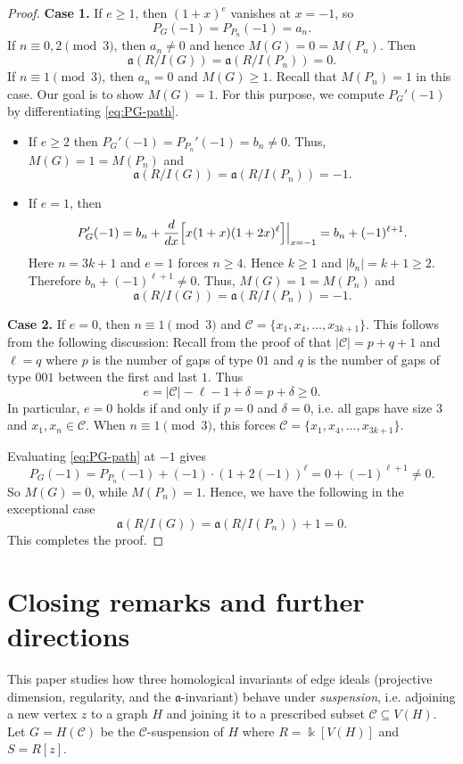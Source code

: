 \documentclass[12pt]{amsart}
\theoremstyle{plain}
\theoremstyle{definition}
\begin{document}
\begin{proof}
\textbf{Case 1.} If \(e\ge 1\), then \((1+x)^e\) vanishes at \(x=-1\), so
\[
P_G(-1)=P_{P_n}(-1)=a_n.
\]
If \(n\equiv 0,2\pmod 3\), then \(a_n\neq 0\) and hence \(M(G)=0=M(P_n)\). Then
   \[ 
    \mathfrak a (R/I(G))=\mathfrak a (R/I(P_n))=0.
   \]
If \(n\equiv 1\pmod 3\), then \(a_n=0\) and \(M(G)\ge 1\). Recall that $M(P_n)=1$ in this case. Our goal is to show $M(G)=1$. For this purpose, we compute \(P_G'(-1)\) by differentiating \eqref{eq:PG-path}.
\begin{itemize}
    \item If \(e\ge 2\) then  \(P_G'(-1)=P_{P_n}'(-1)=b_n\neq 0\).  Thus, \(M(G)=1=M(P_n)\) and
    \[ 
    \mathfrak a (R/I(G))= \mathfrak a (R/I(P_n))= -1.
    \]
    \item If \(e=1\), then 
\[
P_G'(-1)=b_n+\frac{d}{dx}\Bigl[x(1+x)(1+2x)^\ell\Bigr]\Big|_{x=-1}=b_n+(-1)^{\ell+1}.
\]
 Here \(n=3k+1\) and \(e=1\) forces \(n\ge 4\). Hence \(k\ge 1\) and \(|b_n|=k+1\ge 2\).
Therefore \(b_n+(-1)^{\ell+1}\neq 0\). Thus,  \(M(G)=1=M(P_n)\) and
   \[ 
    \mathfrak a (R/I(G))=\mathfrak a (R/I(P_n))=-1.
   \]
\end{itemize}
\textbf{Case 2.}  If \(e=0\), then \(n\equiv 1\pmod 3\) and \(\mathcal C=\{x_1,x_4,\ldots,x_{3k+1}\}\). This follows from the following discussion:
Recall from the proof of   that $|\mathcal C|=p+q+1$ and $ \ell=q$ where $p$ is the number of gaps
of type $01$ and  $q$ is the number of gaps of type $001$ between the first and last $1$. Thus
\[
e=|\mathcal C|-\ell-1+\delta=p+\delta\ge 0.
\]
In particular, \(e=0\) holds if and only if \(p=0\) and \(\delta=0\), i.e. all gaps have size \(3\) and
\(x_1,x_n\in\mathcal C\). When \(n\equiv 1\pmod 3\),  this forces
\(\mathcal C=\{x_1,x_4,\ldots,x_{3k+1}\}\).


 Evaluating \eqref{eq:PG-path} at \(-1\) gives
\[
P_G(-1)=P_{P_n}(-1)+(-1)\cdot(1+2(-1))^\ell
      =0+(-1)^{\ell+1}\neq 0.
\]
So \(M(G)=0\), while \(M(P_n)=1\). Hence, we have the following in the exceptional case
   \[ 
    \mathfrak a (R/I(G))=\mathfrak a (R/I(P_n))+1=0.
   \]
     This completes the proof. 
\end{proof}




\section{Closing remarks and further directions}\label{sec:final}


This paper studies how three homological invariants of edge ideals (projective dimension,
regularity, and the $\mathfrak a$-invariant) behave under \emph{suspension}, i.e. adjoining a new
vertex $z$ to a graph $H$ and joining it to a prescribed subset $\mathcal C\subseteq V(H)$.  Let $G=H(\mathcal{C})$ be the $\mathcal{C}$-suspension of $H$ where $R=\Bbbk [V(H)]$ and $S=R[z]$. 
\end{document}
